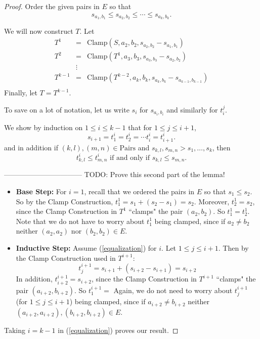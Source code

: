 \documentclass[12pt]{article}
\theoremstyle{definition}
\newcommand{\Pairs}{\mbox{Pairs}}
\newcommand{\Update}{\mbox{Clamp}}
\begin{document}
\begin{proof}
Order the given pairs in $E$ so that
\[  s_{a_1, b_1} \leq s_{a_2, b_2} \leq \cdots\leq s_{a_k, b_k}.
\]

We will now construct $T$.  Let \[ \begin{array}{lcl}
 T^1  & = &  \Update(S,a_2,b_2,s_{a_2, b_2} - s_{a_1, b_1})\\
T^2 & = & \Update(T^1,a_3, b_3, s_{a_3, b_3} - s_{a_2, b_2} )\\
  & \vdots   & \\
T^{k-1} & = & \Update(T^{k-2},a_k,b_k,
s_{a_k, b_k} - s_{a_{k-1}, b_{k-1}})\\
\end{array}
\]
Finally, let $T = T^{k-1}$.

To save on a lot of notation, let us write $s_i$ for $s_{a_i, b_i}$
and similarly for $t^j_i$.  

We show by induction on $1\leq i \leq k -1$ that for $1 \leq j \leq i+1$,
\begin{equation}
\label{equalization}
s_{i+1}  = t^i_{1} = t^i_{2} = \cdots t^i_{i} =  t^i_{i+1}.
\end{equation}
and in addition if $(k, l), (m, n) \in \Pairs$ and $s_{k,l}, s_{m,n} > s_1, \ldots, s_k$, then 
\[ \mbox{$t^i_{k,l} \leq t^i_{m,n} $ if and only if $s_{k,l} \leq s_{m,n} $}.\]

--------------------------------- TODO: Prove this second part of the lemma!

\begin{itemize}
    \item \textbf{Base Step: }
        For $i = 1$, recall that we ordered the pairs in $E$ so that $s_1 \leq s_2$.
        So by the Clamp Construction, $t^1_1 = s_1 + (s_2 - s_1) = s_2$.
        Moreover, $t^1_2= s_2$, since the Clamp Construction in $T^1$ ``clamps" the pair $(a_2, b_2)$.
        So $t^1_1 = t^1_2$.  Note that we do not have to worry about $t^1_1$ being clamped, since if $a_2 \ne b_2$ neither $(a_2, a_2)$ nor $(b_2, b_2) \in E$.
    
    \item \textbf{Inductive Step: }
        Assume (\ref{equalization}) for  $i$.  Let   $1\leq j \leq i+1$.
        Then by the Clamp Construction used in $T^{i+1}$:
            \[ t^{i+1}_j = s_{i+1} + (s_{i+2} - s_{i+1}) = s_{i+2}\]
        In addition, $t^{i+1}_{i+2} = s_{i+2}$, since the Clamp Construction in $T^{i+1}$ ``clamps"
        the pair $(a_{i+2}, b_{i+2})$.  So $t^{i+1}_1 = $
        Again, we do not need to worry about $t^{i+1}_j$ (for $1 \leq j \leq i+1$) being clamped, since if $a_{i+2} \ne b_{i+2}$ neither $(a_{i+2}, a_{i+2}), (b_{i+2}, b_{i+2}) \in E$.
        
\end{itemize}

Taking $i = k -1$ in (\ref{equalization}) proves our result.
\end{proof}
 
\end{document}
